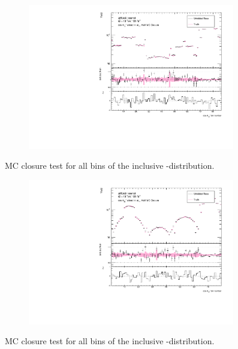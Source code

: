 \begin{figure}[htb]
  \centering
  \begin{subfigure}{.65\textwidth}\centering\includegraphics[width = 0.99\textwidth]{Figures/m4l/UnfoldingStudies/v014_closure/HalfMCClosure_withPull_cosThetaStar1_m4l.pdf}\end{subfigure}
\caption{MC closure test for all bins of the inclusive \costhetastar-\mFourL distribution.}
 \end{figure}

\begin{figure}[htb]
  \centering
  \begin{subfigure}{.65\textwidth}\centering\includegraphics[width = 0.99\textwidth]{Figures/m4l/UnfoldingStudies/v014_closure/HalfMCClosure_withPull_cosThetaStar3_m4l.pdf}\end{subfigure}
\caption{MC closure test for all bins of the inclusive \costhetastar-\mFourL distribution.}
 \end{figure}

